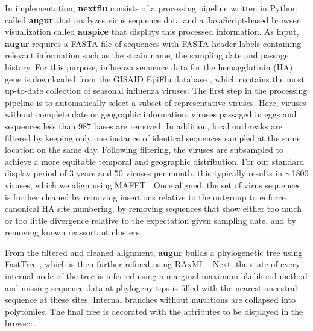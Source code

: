 \documentclass{bioinfo}
\newcommand{\augur}{\textbf{augur}}
\newcommand{\auspice}{\textbf{auspice}}
\newcommand{\nextflu}{\textbf{nextflu}}
\begin{document}
In implementation, \nextflu{} consists of a processing pipeline written in Python called \augur{} that analyzes virus sequence data and a JavaScript-based browser visualization called \auspice{} that displays this processed information.
As input, \augur{} requires a FASTA file of sequences with FASTA header labels containing relevant information such as the strain name, the sampling date and passage history.
For this purpose, influenza sequence data for the hemagglutinin (HA) gene is downloaded from the GISAID EpiFlu database \citep{GISAID}, which contains the most up-to-date collection of seasonal influenza viruses.
The first step in the processing pipeline is to automatically select a subset of representative viruses.
Here, viruses without complete date or geographic information, viruses passaged in eggs and sequences less than 987 bases are removed.
In addition, local outbreaks are filtered by keeping only one instance of identical sequences sampled at the same location on the same day.
Following filtering, the viruses are subsampled to achieve a more equitable temporal and geographic distribution.
For our standard display period of 3 years and 50 viruses per month, this typically results in $\sim$1800 viruses, which we align using MAFFT \citep{katoh_mafft_2013}.
Once aligned, the set of virus sequences is further cleaned by removing insertions relative to the outgroup to enforce canonical HA site numbering, by removing sequences that show either too much or too little divergence relative to the expectation given sampling date, and by removing known reassortant clusters.

From the filtered and cleaned alignment, \augur{} builds a phylogenetic tree using FastTree \citep{price_fasttree_2009}, which is then further refined using RAxML \citep{stamatakis_raxml_2014}.
Next, the state of every internal node of the tree is inferred using a marginal maximum likelihood method and missing sequence data at phylogeny tips is filled with the nearest ancestral sequence at these sites.
Internal branches without mutations are collapsed into polytomies.
The final tree is decorated with the attributes to be displayed in the browser. %
\end{document}

